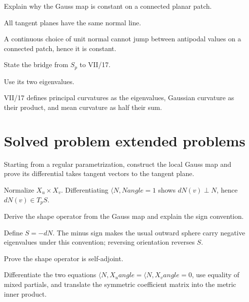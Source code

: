 \begin{exercise}\label{exr:vii16-23}
Explain why the Gauss map is constant on a connected planar patch.
\end{exercise}
\begin{hint}
All tangent planes have the same normal line.
\end{hint}
\begin{solution}
A continuous choice of unit normal cannot jump between antipodal values on a connected patch, hence it is constant.
\end{solution}

\begin{exercise}\label{exr:vii16-24}
State the bridge from \(S_p\) to VII/17.
\end{exercise}
\begin{hint}
Use its two eigenvalues.
\end{hint}
\begin{solution}
VII/17 defines principal curvatures as the eigenvalues, Gaussian curvature as their product, and mean curvature as half their sum.
\end{solution}

\section{Solved problem extended problems}
\begin{problem}\label{prob:vii16-01}
Starting from a regular parametrization, construct the local Gauss map and prove its differential takes tangent vectors to the tangent plane.
\end{problem}
\begin{solution}
Normalize \(X_u\times X_v\). Differentiating \(\langle N,N
angle=1\) shows \(dN(v)\perp N\), hence \(dN(v)\in T_pS\).
\end{solution}

\begin{problem}\label{prob:vii16-02}
Derive the shape operator from the Gauss map and explain the sign convention.
\end{problem}
\begin{solution}
Define \(S=-dN\). The minus sign makes the usual outward sphere carry negative eigenvalues under this convention; reversing orientation reverses \(S\).
\end{solution}

\begin{problem}\label{prob:vii16-03}
Prove the shape operator is self-adjoint.
\end{problem}
\begin{solution}
Differentiate the two equations \(\langle N,X_u
angle=\langle N,X_v
angle=0\), use equality of mixed partials, and translate the symmetric coefficient matrix into the metric inner product.
\end{solution}


